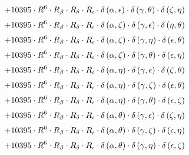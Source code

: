\begin{subequations}
\begin{gather}
 \\[0.2em] \notag 		 + 10395 \cdot R^{6} \cdot R_{\beta{}} \cdot R_{\delta{}} \cdot R_{\iota{}} \cdot \delta{}\left(\alpha{}, \epsilon{}\right) \cdot \delta{}\left(\gamma{}, \theta{}\right) \cdot \delta{}\left(\zeta{}, \eta{}\right) 
 \\[0.2em] \notag 		 + 10395 \cdot R^{6} \cdot R_{\beta{}} \cdot R_{\delta{}} \cdot R_{\iota{}} \cdot \delta{}\left(\alpha{}, \zeta{}\right) \cdot \delta{}\left(\gamma{}, \epsilon{}\right) \cdot \delta{}\left(\eta{}, \theta{}\right) 
 \\[0.2em] \notag 		 + 10395 \cdot R^{6} \cdot R_{\beta{}} \cdot R_{\delta{}} \cdot R_{\iota{}} \cdot \delta{}\left(\alpha{}, \zeta{}\right) \cdot \delta{}\left(\gamma{}, \eta{}\right) \cdot \delta{}\left(\epsilon{}, \theta{}\right) 
 \\[0.2em] \notag 		 + 10395 \cdot R^{6} \cdot R_{\beta{}} \cdot R_{\delta{}} \cdot R_{\iota{}} \cdot \delta{}\left(\alpha{}, \zeta{}\right) \cdot \delta{}\left(\gamma{}, \theta{}\right) \cdot \delta{}\left(\epsilon{}, \eta{}\right) 
 \\[0.2em] \notag 		 + 10395 \cdot R^{6} \cdot R_{\beta{}} \cdot R_{\delta{}} \cdot R_{\iota{}} \cdot \delta{}\left(\alpha{}, \eta{}\right) \cdot \delta{}\left(\gamma{}, \epsilon{}\right) \cdot \delta{}\left(\zeta{}, \theta{}\right) 
 \\[0.2em] \notag 		 + 10395 \cdot R^{6} \cdot R_{\beta{}} \cdot R_{\delta{}} \cdot R_{\iota{}} \cdot \delta{}\left(\alpha{}, \eta{}\right) \cdot \delta{}\left(\gamma{}, \zeta{}\right) \cdot \delta{}\left(\epsilon{}, \theta{}\right) 
 \\[0.2em] \notag 		 + 10395 \cdot R^{6} \cdot R_{\beta{}} \cdot R_{\delta{}} \cdot R_{\iota{}} \cdot \delta{}\left(\alpha{}, \eta{}\right) \cdot \delta{}\left(\gamma{}, \theta{}\right) \cdot \delta{}\left(\epsilon{}, \zeta{}\right) 
 \\[0.2em] \notag 		 + 10395 \cdot R^{6} \cdot R_{\beta{}} \cdot R_{\delta{}} \cdot R_{\iota{}} \cdot \delta{}\left(\alpha{}, \theta{}\right) \cdot \delta{}\left(\gamma{}, \epsilon{}\right) \cdot \delta{}\left(\zeta{}, \eta{}\right) 
 \\[0.2em] \notag 		 + 10395 \cdot R^{6} \cdot R_{\beta{}} \cdot R_{\delta{}} \cdot R_{\iota{}} \cdot \delta{}\left(\alpha{}, \theta{}\right) \cdot \delta{}\left(\gamma{}, \zeta{}\right) \cdot \delta{}\left(\epsilon{}, \eta{}\right) 
 \\[0.2em] \notag 		 + 10395 \cdot R^{6} \cdot R_{\beta{}} \cdot R_{\delta{}} \cdot R_{\iota{}} \cdot \delta{}\left(\alpha{}, \theta{}\right) \cdot \delta{}\left(\gamma{}, \eta{}\right) \cdot \delta{}\left(\epsilon{}, \zeta{}\right) 

\end{gather}
\end{subequations}
